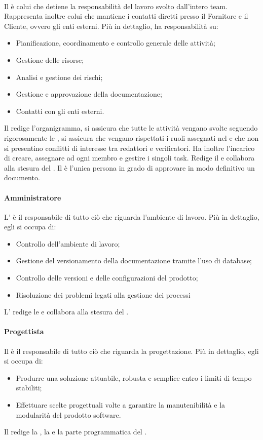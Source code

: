 \paragraph{\RdP}
Il \textsl{\RdP} è colui che detiene la responsabilità del 
lavoro svolto dall'intero team. Rappresenta inoltre colui che mantiene i 
contatti diretti presso il Fornitore e il Cliente, ovvero gli enti esterni. Più 
in dettaglio, ha responsabilità su:
\begin{itemize}
  \item Pianificazione, coordinamento e controllo generale delle attività;
  \item Gestione delle risorse;
  \item Analisi e gestione dei rischi;
  \item Gestione e approvazione della documentazione;
  \item Contatti con gli enti esterni.
\end{itemize}
Il \textsl{\RdP} redige l'organigramma, si assicura che 
tutte le attività vengano svolte seguendo rigorosamente le \textsl{\NdP}, si 
assicura che vengano rispettati i ruoli assegnati nel \textsl{\PdP} e che non si 
presentino conflitti di interesse tra redattori e verificatori. Ha inoltre 
l'incarico di creare, assegnare ad ogni membro e gestire i singoli task. Redige 
il \textsl{\PdP} e collabora alla stesura del \textsl{\PdQ}. Il \textsl{\RdP} è 
l'unica persona in grado di approvare in modo definitivo un documento.

\paragraph{Amministratore}
L'\textsl{\Amm} è il responsabile di tutto ciò che riguarda l'ambiente di 
lavoro. Più in dettaglio, egli si occupa di:
\begin{itemize}
  \item Controllo dell'ambiente di lavoro;
  \item Gestione del versionamento della documentazione tramite l'uso di 
  database;
  \item Controllo delle versioni e delle configurazioni del prodotto;
  \item Risoluzione dei problemi legati alla gestione dei processi
\end{itemize}
L'\textsl{\Amm} redige le \textsl{\NdP} e collabora alla stesura del 
\textsl{\PdP}.

\paragraph{Progettista}
Il \textsl{\Prog} è il responsabile di tutto ciò che riguarda la progettazione. 
Più in dettaglio, egli si occupa di:
\begin{itemize}
  \item Produrre una soluzione attuabile, robusta e semplice entro i limiti di 
  tempo stabiliti;
  \item Effettuare scelte progettuali volte a garantire la manutenibilità e la 
  modularità del prodotto software.
\end{itemize}
Il \textsl{\Prog} redige la \textsl{\ST}, la \textsl{\DDP} e la parte 
programmatica del \textsl{\PdQ}.


